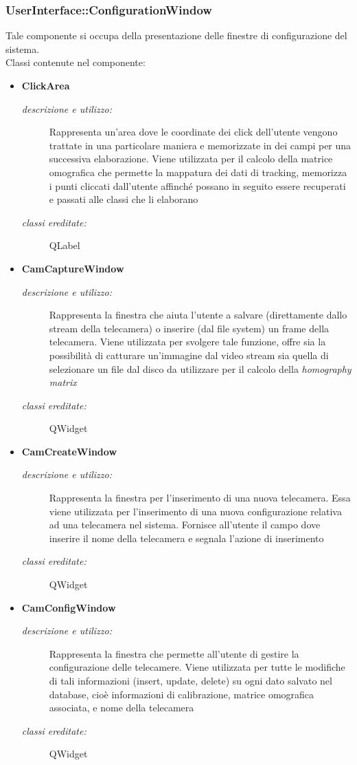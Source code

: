 \subsubsection{UserInterface::ConfigurationWindow} \label{sec:c1.1}
Tale componente si occupa della presentazione delle finestre di configurazione del sistema. \\
Classi contenute nel componente: 
\begin{itemize} 
\item \textbf{ClickArea}
\begin{description}
\item [\textit{descrizione e utilizzo:}] Rappresenta un'area dove le coordinate dei click dell'utente vengono trattate in una particolare maniera e memorizzate in dei campi per una successiva elaborazione. Viene utilizzata per il calcolo della matrice omografica che permette la mappatura dei dati di tracking, memorizza i punti cliccati dall'utente affinché possano in seguito essere recuperati e passati alle classi che li elaborano
\item [\textit{classi ereditate:}] QLabel
\end{description}
\item \textbf{CamCaptureWindow}
\begin{description}
\item [\textit{descrizione e utilizzo:}] Rappresenta la finestra che aiuta l'utente a salvare (direttamente dallo stream della telecamera) o inserire (dal file system) un frame della telecamera. Viene utilizzata per svolgere tale funzione, offre sia la possibilità di catturare un'immagine dal video stream sia quella di selezionare un file dal disco da utilizzare per il calcolo della \textit{homography matrix}
\item [\textit{classi ereditate:}] QWidget
\end{description}
\item \textbf{CamCreateWindow}
\begin{description}
\item [\textit{descrizione e utilizzo:}] Rappresenta la finestra per l'inserimento di una nuova telecamera. Essa viene utilizzata per l'inserimento di una nuova configurazione relativa ad una telecamera nel sistema. Fornisce all'utente il campo dove inserire il nome della telecamera e segnala l'azione di inserimento 
\item [\textit{classi ereditate:}] QWidget
\end{description}
\item \textbf{CamConfigWindow}
\begin{description}
\item [\textit{descrizione e utilizzo:}] Rappresenta la finestra che permette all'utente di gestire la configurazione delle telecamere. Viene utilizzata per tutte le modifiche di tali informazioni (insert, update, delete) su ogni dato salvato nel database, cioè informazioni di calibrazione, matrice omografica associata, e nome della telecamera
\item [\textit{classi ereditate:}] QWidget
\end{description}
\end{itemize}

